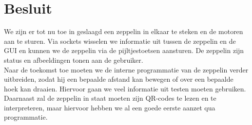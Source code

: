 \documentclass[tt]{penoverslag}
\begin{document}
\section{Besluit}
We zijn er tot nu toe in geslaagd een zeppelin in elkaar te steken en de motoren aan te sturen. Via sockets wisselen we informatie uit tussen de zeppelin en de GUI en kunnen we de zeppelin via de pijltjestoetsen aansturen. De zeppelin zijn status en afbeeldingen tonen aan de gebruiker. \\

Naar de toekomst toe moeten we de interne programmatie van de zeppelin verder uitbreiden, zodat hij een bepaalde afstand kan bewegen of over een bepaalde hoek kan draaien. Hiervoor gaan we veel informatie uit testen moeten gebruiken. Daarnaast zal de zeppelin in staat moeten zijn QR-codes te lezen en te interpreteren, maar hiervoor hebben we al een goede eerste aanzet qua programmatie.



\newpage\makeappendix
\end{document}
